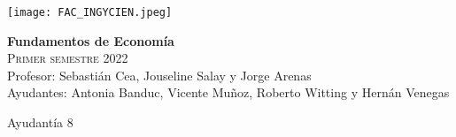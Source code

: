 \documentclass[addpoints,answers]{exam}
\begin{document}


\begin{multicols}{2}

\vspace*{0.24cm}
	\texttt{[image: FAC\_INGYCIEN.jpeg]}
	\begin{center}
		\textbf{Fundamentos de Economía}\\
		\textsc{Primer semestre 2022}\\
		Profesor: Sebastián Cea, Jouseline Salay y Jorge Arenas\\
		Ayudantes: Antonia Banduc, Vicente Muñoz, Roberto Witting y Hernán Venegas
	\end{center}

\end{multicols}

\begin{center}

\sc Ayudantía 8

\end{center}
\end{document}
